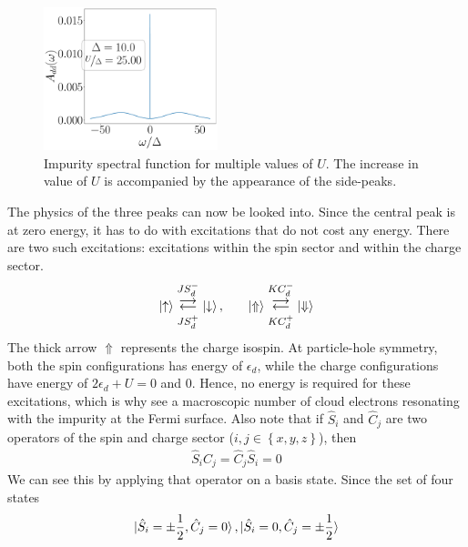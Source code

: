 \documentclass[10pt]{report}
\numberwithin{equation}{section}
\begin{document}
\begin{figure}[!htb]
	\includegraphics[width=0.45\textwidth]{../figures/spec_func_Ub=0_U_by_delta=25.00.pdf}
	\caption{Impurity spectral function for multiple values of \(U\). The increase in value of \(U\) is accompanied by the appearance of the side-peaks.}
	\label{spec_func}
\end{figure}
The physics of the three peaks can now be looked into. Since the central peak is at zero energy, it has to do with excitations that do not cost any energy. There are two such excitations: excitations within the spin sector and within the charge sector.
\begin{equation}\begin{aligned}
	\ket{\uparrow} \mathrel{\mathlarger{\mathlarger{\mathop{\rightleftarrows}}^{J S_d^-}_{JS_d^+}}}\ket{\downarrow}, &&&&\ket{\Uparrow} \mathrel{\mathlarger{\mathlarger{\mathop{\rightleftarrows}}^{K C_d^-}_{K C_d^+}}}\ket{\Downarrow}\\
\end{aligned}\end{equation}
The thick arrow \(\Uparrow\) represents the charge isospin. At particle-hole symmetry, both the spin configurations has energy of \(\epsilon_d\), while the charge configurations have energy of \(2\epsilon_d + U=0\) and 0. Hence, no energy is required for these excitations, which is why see a macroscopic number of cloud electrons resonating with the impurity at the Fermi surface. Also note that if \(\hat S_i\) and \(\hat C_j\) are two operators of the spin and charge sector (\(i,j \in \left\{ x,y,z \right\} \)), then
\begin{equation}\begin{aligned}
	\hat S_i \hat C_j = \hat C_j \hat S_i = 0
\end{aligned}\end{equation}
We can see this by applying that operator on a basis state. Since the set of four states 
\begin{equation}\begin{aligned}
	\ket{\hat S_i = \pm \frac{1}{2}, \hat C_j = 0}, \ket{\hat S_i = 0, \hat C_j = \pm\frac{1}{2}}
\end{aligned}\end{equation}
\end{document}
